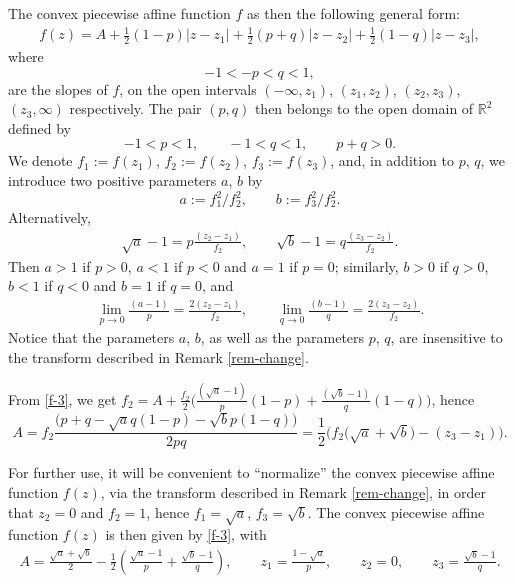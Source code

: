 \documentclass[pdftex]{sigma}
\numberwithin{equation}{section}
\begin{document}
The convex piecewise affine function $f$ as then the following general form:
\begin{gather} \label{f-3} f (z) = A + \frac{1}{2} (1 - p) |z - z _1| + \frac{1}{2} (p + q) |z - z_2| + \frac{1}{2} (1 - q) |z - z _3|, \end{gather}
where
\[ - 1 < - p < q < 1, \]
are the slopes of $f$, on the open intervals $(- \infty, z_1)$, $(z _1, z_2)$, $(z_2, z_3)$, $(z _3, \infty)$ respectively. The pair $(p, q)$ then belongs to the open domain of $\mathbb{R} ^2$ defined by
\[ %
 - 1 < p < 1, \qquad - 1 < q < 1, \qquad p + q > 0.\]
We denote $f _1 := f (z _1)$, $f_2 := f(z_2) $, $f_3 := f (z_3)$, and, in addition to $p$, $q$, we introduce two positive parameters $a$, $b$ by
\[%
 a := f_1 ^2/f_2 ^2, \qquad b := f_3 ^2/f_2 ^2. \]
Alternatively,
\begin{gather} \label{ab-pq} \sqrt{a} - 1 = p \frac{(z_2 - z_1)}{f_2}, \qquad \sqrt{b} - 1 = q \frac{(z_3 - z_2)}{f_2}. \end{gather}
Then $a > 1$ if $p > 0$, $a <1$ if $p < 0$ and $a = 1$ if $p = 0$; similarly, $b > 0$ if $q > 0$, $b < 1$ if $q < 0$ and $b = 1$ if $q = 0$, and
\begin{gather} \label{lim} \lim _{p \to 0}{\frac{(a - 1)}{p}} = \frac{2 (z_2 - z_1)}{f_2}, \qquad \lim_{q \to 0}{\frac{(b - 1)}{q}} = \frac{2 (z_3 - z_2)}{f_2}. \end{gather}
Notice that the parameters $a$, $b$, as well as the parameters $p$, $q$, are insensitive to the transform described in Remark \ref{rem-change}.


From \eqref{f-3}, we get $f_2 = A + \frac{f_2}{2} \big(\frac{(\sqrt{a} - 1)}{p} (1 - p) + \frac{(\sqrt{b} - 1)}{q} (1 - q)\big)$, hence
\[%
A = f_2 \frac{\big(p + q - \sqrt{a} q (1 - p) - \sqrt{b} p (1 - q)\big)}{2 p q} =
\frac{1}{2} \big(f _2 \big(\sqrt{a} + \sqrt{b}\big) - (z _3 - z_1)\big). \]

\begin{rem} \label{rem-normalised} For further use, it will be convenient to ``normalize'' the convex piecewise affine function $f (z)$, via the transform described in Remark \ref{rem-change}, in order that $z _2 = 0$ and $f _2 = 1$, hence $f_1 = \sqrt{a}$, $f_3 = \sqrt{b}$. The convex piecewise affine function $f (z)$ is then given by \eqref{f-3}, with
\begin{gather*}
 A = \frac{\sqrt{a} + \sqrt{b}}{2} - \frac{1}{2} \left(\frac{\sqrt{a} - 1}{p} + \frac{\sqrt{b} - 1}{q}\right), \qquad z _1 = \frac{1 - \sqrt{a}}{p}, \qquad z _2 = 0, \qquad z _3 = \frac{\sqrt{b} - 1}{q}. \end{gather*}
\end{rem}
\end{document}
